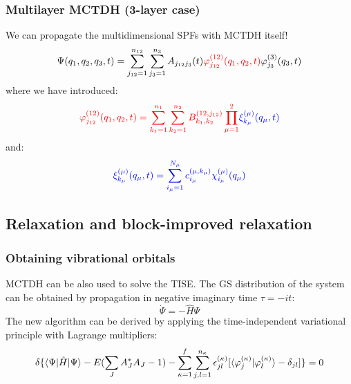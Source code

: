 \documentclass{beamer}
\begin{document}
\begin{frame}
  \frametitle{Multilayer MCTDH (3-layer case)}
We can propagate the multidimensional SPFs with MCTDH itself!
\begin{equation}
	\Psi(q_1, q_2, q_3, t) = \sum_{j_{12}=1}^{n_{12}}\sum_{j_3 = 1}^{n_3}A_{j_{12}j_3}(t)\textcolor{red}{\varphi^{(12)}_{j_{12}}(q_1,q_2,t)}\varphi^{(3)}_{j_{3}}(q_3,t)
\end{equation}
where we have introduced:
\begin{equation}
	\textcolor{red}{\varphi^{(12)}_{j_{12}}(q_1,q_2,t) = \sum_{k_1 = 1}^{n_1}\sum_{k_2=1}^{n_2}B_{k_1,k_2}^{(12,j_{12})}\prod_{\mu=1}^2} \textcolor{blue}{\xi_{k_{\mu}}^{(\mu)}(q_{\mu},t)}
\end{equation}
and:
\begin{equation}
	\textcolor{blue}{\xi_{k_{\mu}}^{(\mu)}(q_{\mu},t) = \sum_{i_{\mu}=1}^{N_{\mu}} c_{i_{\mu}}^{(\mu,k_{\mu})}\chi_{i_{\mu}}^{(\mu)}(q_{\mu})}
\end{equation}
  
\end{frame}

\subsection{Relaxation and block-improved relaxation}\label{relax}

\begin{frame}
  \frametitle{Obtaining vibrational orbitals}
  MCTDH can be also used to solve the TISE. The GS distribution of the system can be obtained by propagation in negative imaginary time \(\tau=-it\):
\begin{equation}
	\dot{\Psi} = -\hat{H}\Psi
\end{equation}
The new algorithm can be derived by applying the time-independent variational principle with Lagrange multipliers:
\begin{equation}
\delta \{\braket{\Psi|\hat{H}|\Psi} -E(\sum_J A_J^{*}A_J-1) -\sum_{\kappa=1}^f\sum_{j,l=1}^{n_{\kappa}}\epsilon^{(\kappa)}_{jl}[\braket{\varphi_j^{(\kappa)}|\varphi_l^{(\kappa)}} - \delta_{jl}] \} = 0	
\end{equation}
\end{frame}
\end{document}
